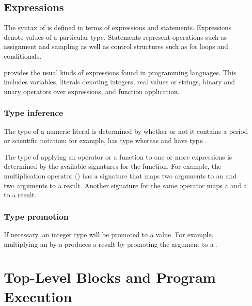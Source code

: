 \documentclass[article]{jss}
\begin{document}
\subsection{Expressions}\label{expressions.section}

The syntax of  is defined in terms of expressions and
statements.  Expressions denote values of a particular type.  
Statements represent operations such as assignment and sampling as
well as control structures such as for loops and conditionals.

 provides the usual kinds of expressions found in
programming languages.  This includes variables, literals denoting
integers, real values or strings, binary and unary operators over
expressions, and function application.  

\subsubsection{Type inference}

The type of a numeric literal is determined by whether or not it
contains a period or scientific notation; for example,  has
type  whereas  and  have type
.

The type of applying an operator or a function to one or more
expressions is determined by the available signatures for the
function.  For example, the multiplication operator (\code{*}) has a
signature that maps two  arguments to an  and two
 arguments to a  result.  Another signature for
the same operator maps a  and a  to a
 result.

\subsubsection{Type promotion}

If necessary, an integer type will be promoted to a  value.
For example, multiplying an  by a  produces a
 result by promoting the  argument to a
.  



\section{Top-Level Blocks and Program Execution}\label{programming.section}\label{hierarchical-modeling.section}
\end{document}
